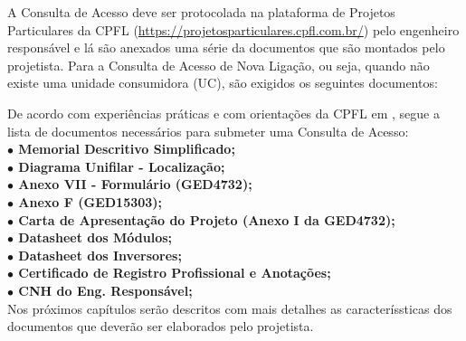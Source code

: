 A Consulta de Acesso deve ser protocolada na plataforma de Projetos Particulares da CPFL (\href{https://projetosparticulares.cpfl.com.br/}{\color{blue}https://projetosparticulares.cpfl.com.br/}) pelo engenheiro responsável e lá são anexados uma série da documentos que são montados pelo projetista. Para a Consulta de Acesso de Nova Ligação, ou seja, quando não existe uma unidade consumidora (UC), são exigidos os seguintes documentos:

De acordo com experiências práticas e com orientações da CPFL em \cite{CartilhaCpfl}, segue a lista de documentos necessários para submeter uma Consulta de Acesso:\\

\hspace{0.2cm} \textbf{ $\bullet$ \hspace{0.1cm} Memorial Descritivo Simplificado;}\\[-0.5cm]

\hspace{0.2cm} \textbf{ $\bullet$ \hspace{0.1cm} Diagrama Unifilar - Localização;}\\[-0.5cm]

\hspace{0.2cm} \textbf{ $\bullet$ \hspace{0.1cm} Anexo VII - Formulário (GED4732);}\\[-0.5cm]

\hspace{0.2cm} \textbf{ $\bullet$ \hspace{0.1cm} Anexo F (GED15303);}\\[-0.5cm]

\hspace{0.2cm} \textbf{ $\bullet$ \hspace{0.1cm} Carta de Apresentação do Projeto (Anexo I da GED4732);}\\[-0.5cm]

\hspace{0.2cm} \textbf{ $\bullet$ \hspace{0.1cm} Datasheet dos Módulos;}\\[-0.5cm]

\hspace{0.2cm} \textbf{ $\bullet$ \hspace{0.1cm} Datasheet dos Inversores;}\\[-0.5cm]

\hspace{0.2cm} \textbf{ $\bullet$ \hspace{0.1cm} Certificado de Registro Profissional e Anotações;}\\[-0.5cm]

\hspace{0.2cm} \textbf{ $\bullet$ \hspace{0.1cm} CNH do Eng. Responsável;}\\

Nos próximos capítulos serão descritos com mais detalhes as caracteríssticas dos documentos que deverão ser elaborados pelo projetista.
